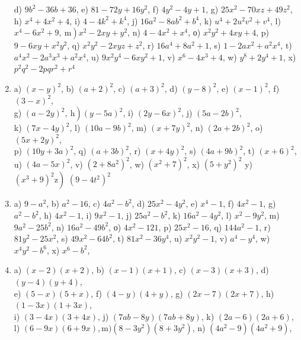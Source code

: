 \documentclass[10pt]{article}
\begin{document}
\begin{enumerate}
d) \(9 b^{2}-36 b+36\), e) \(81-72 y+16 y^{2}\), f) \(4 y^{2}-4 y+1\), g) \(25 x^{2}-70 x z+49 z^{2}\), h) \(x^{4}+4 x^{2}+4\), i) \(4-4 k^{2}+k^{4}\), j) \(16 a^{2}-8 a b^{2}+b^{4}\), k) \(u^{4}+2 u^{2} v^{2}+v^{4}\), l) \(\left.x^{4}-6 x^{2}+9, \mathrm{~m}\right) x^{2}-2 x y+y^{2}\), n) \(4-4 x^{2}+x^{4}\), о) \(x^{2} y^{2}+4 x y+4\), p) \(9-6 x y+x^{2} y^{2}\), q) \(x^{2} y^{2}-2 x y z+z^{2}\), r) \(16 a^{4}+8 a^{2}+1\), s) \(1-2 a x^{2}+a^{2} x^{4}\), t) \(a^{4} x^{2}-2 a^{3} x^{3}+a^{2} x^{4}\), u) \(9 x^{2} y^{4}-6 x y^{2}+1\), v) \(x^{6}-4 x^{3}+4\), w) \(y^{8}+2 y^{4}+1\), x) \(p^{2} q^{2}-2 p q r^{2}+r^{4}\)
  \item a) \((x-y)^{2}\), b) \((a+2)^{2}\), c) \((a+3)^{2}\), d) \((y-8)^{2}\), e) \((x-1)^{2}\), f) \((3-x)^{2}\),\\
g) \(\left.(a-2 y)^{2}, \mathrm{~h}\right)(y-5 a)^{2}\), i) \((2 y-6 x)^{2}\), j) \((5 a-2 b)^{2}\),\\
k) \((7 x-4 y)^{2}\), l) \((10 a-9 b)^{2}\), m) \((x+7 y)^{2}\), n) \((2 a+2 b)^{2}\), o) \((5 x+2 y)^{2}\),\\
p) \((10 y+3 a)^{2}\), q) \((a+3 b)^{2}\), r) \((x+4 y)^{2}\), s) \((4 a+9 b)^{2}\), t) \((x+6)^{2}\),\\
u) \((4 a-5 x)^{2}\), v) \(\left(2+8 a^{2}\right)^{2}\), w) \(\left(x^{2}+7\right)^{2}\), x) \(\left(5+y^{2}\right)^{2}\) y) \(\left.\left(x^{3}+9\right)^{2} \mathrm{z}\right)\) \(\left(9-4 t^{2}\right)^{2}\)
  \item a) \(9-a^{2}\), b) \(a^{2}-16\), c) \(4 a^{2}-b^{2}\), d) \(25 x^{2}-4 y^{2}\), e) \(x^{4}-1\), f) \(4 x^{2}-1\), g) \(a^{2}-b^{2}\), h) \(4 x^{2}-1\), i) \(9 x^{2}-1\), j) \(25 a^{2}-b^{2}\), k) \(16 a^{2}-4 y^{2}\), l) \(x^{2}-9 y^{2}\), m) \(9 a^{2}-25 b^{2}\), n) \(16 a^{2}-49 b^{2}\), о) \(4 x^{2}-121\), p) \(25 x^{2}-16\), q) \(144 a^{2}-1\), r) \(81 y^{2}-25 x^{2}\), s) \(49 x^{2}-64 b^{2}\), t) \(81 x^{2}-36 y^{4}\), u) \(x^{2} y^{2}-1\), v) \(a^{4}-y^{4}\), w) \(x^{4} y^{2}-b^{6}\), x) \(x^{6}-b^{2}\),
  \item a) \((x-2)(x+2)\), b) \((x-1)(x+1)\), c) \((x-3)(x+3)\), d) \((y-4)(y+4)\),\\
e) \((5-x)(5+x)\), f) \((4-y)(4+y)\), g) \((2 x-7)(2 x+7)\), h) \((1-3 x)(1+3 x)\),\\
i) \((3-4 x)(3+4 x)\), j) \((7 a b-8 y)(7 a b+8 y)\), k) \((2 a-6)(2 a+6)\),\\
l) \((6-9 x)(6+9 x), \mathrm{m})\left(8-3 y^{2}\right)\left(8+3 y^{2}\right)\), n) \(\left(4 a^{2}-9\right)\left(4 a^{2}+9\right)\),\\

\end{enumerate}
\end{document}
